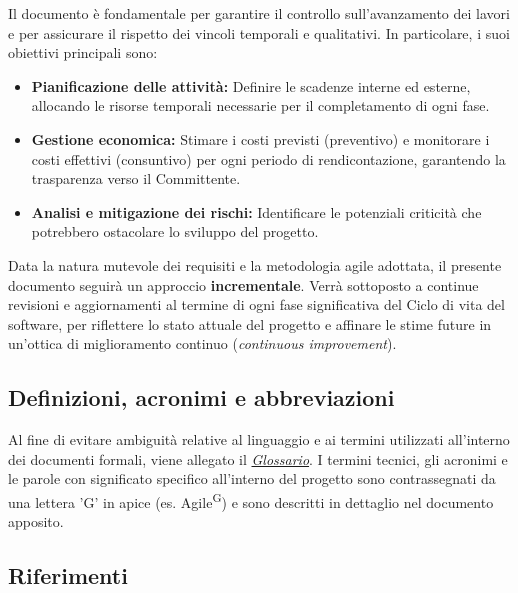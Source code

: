 \documentclass[a4paper,12pt]{article}
\begin{document}
Il documento è fondamentale per garantire il controllo sull'avanzamento dei lavori e per assicurare il rispetto dei vincoli temporali e qualitativi. In particolare, i suoi obiettivi principali sono:

\begin{itemize}
    \item \textbf{Pianificazione delle attività:} Definire le scadenze interne ed esterne, allocando le risorse temporali necessarie per il completamento di ogni fase.
    \item \textbf{Gestione economica:} Stimare i costi previsti (preventivo) e monitorare i costi effettivi (consuntivo) per ogni periodo di rendicontazione, garantendo la trasparenza verso il Committente.
    \item \textbf{Analisi e mitigazione dei rischi:} Identificare le potenziali criticità che potrebbero ostacolare lo sviluppo del progetto.
\end{itemize}

Data la natura mutevole dei requisiti e la metodologia agile adottata, il presente documento seguirà un approccio \textbf{incrementale}. Verrà sottoposto a continue revisioni e aggiornamenti al termine di ogni fase significativa del Ciclo di vita del software, per riflettere lo stato attuale del progetto e affinare le stime future in un'ottica di miglioramento continuo (\textit{continuous improvement}).


\subsection{Definizioni, acronimi e abbreviazioni} \label{sec:definizioni_acronimi_abbreviazioni}

Al fine di evitare ambiguità relative al linguaggio e ai termini utilizzati all'interno dei documenti formali, viene allegato il \href{https://swe-bitbybit.github.io/SWE-docs/docs/RTB/documenti_interni/Glossario.pdf}{\textit{Glossario}}.
I termini tecnici, gli acronimi e le parole con significato specifico all'interno del progetto sono contrassegnati da una lettera 'G' in apice (es. Agile\textsuperscript{G}) e sono descritti in dettaglio nel documento apposito.


\subsection{Riferimenti} \label{sec:riferimenti}
\end{document}

